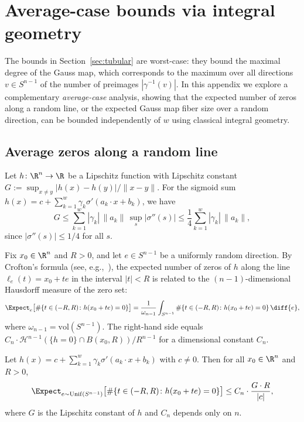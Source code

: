 \section{Average-case bounds via integral geometry}\label{app:averaging}

The bounds in Section~\ref{sec:tubular} are worst-case: they bound the maximal degree of the Gauss map, which corresponds to the maximum over all directions $v\in S^{n-1}$ of the number of preimages $|\gamma^{-1}(v)|$. In this appendix we explore a complementary \emph{average-case} analysis, showing that the expected number of zeros along a random line, or the expected Gauss map fiber size over a random direction, can be bounded independently of $w$ using classical integral geometry.

\subsection{Average zeros along a random line}

Let $h\colon \R^n\to \R$ be a Lipschitz function with Lipschitz constant $G := \sup_{x\neq y} |h(x)-h(y)|/\|x-y\|$. For the sigmoid sum $h(x) = c + \sum_{k=1}^w \gamma_k \sigma'(a_k\cdot x + b_k)$, we have
\begin{equation*}
  G \leq \sum_{k=1}^w |\gamma_k|\, \|a_k\|\, \sup_s |\sigma''(s)| \leq \frac{1}{4}\sum_{k=1}^w |\gamma_k|\, \|a_k\|,
\end{equation*}
since $|\sigma''(s)| \leq 1/4$ for all $s$.

Fix $x_0\in \R^n$ and $R > 0$, and let $e\in S^{n-1}$ be a uniformly random direction. By Crofton's formula (see, e.g.,~\cite[Chapter~14]{gray2004tubes}), the expected number of zeros of $h$ along the line $\ell_e(t) = x_0 + te$ in the interval $|t| < R$ is related to the $(n-1)$-dimensional Hausdorff measure of the zero set:
\begin{equation}\label{eq:crofton}
  \Expect_e\bigl[\#\{t\in (-R,R) \colon h(x_0+te) = 0\}\bigr] = \frac{1}{\omega_{n-1}} \int_{S^{n-1}} \#\{t\in (-R,R)\colon h(x_0+te)=0\}\,\diff{e},
\end{equation}
where $\omega_{n-1} = \mathrm{vol}(S^{n-1})$. The right-hand side equals $C_n \cdot \mathcal{H}^{n-1}(\{h=0\}\cap B(x_0,R))/R^{n-1}$ for a dimensional constant $C_n$.

\begin{proposition}\label{prop:avg-zeros}
Let $h(x) = c + \sum_{k=1}^w \gamma_k \sigma'(a_k\cdot x+b_k)$ with $c\neq 0$. Then for all $x_0\in \R^n$ and $R > 0$,
\begin{equation}\label{eq:avg-zero-bound}
  \Expect_{e\sim \mathrm{Unif}(S^{n-1})}\bigl[\#\{t\in (-R,R)\colon h(x_0+te) = 0\}\bigr] \leq C_n \cdot \frac{G\cdot R}{|c|},
\end{equation}
where $G$ is the Lipschitz constant of $h$ and $C_n$ depends only on $n$.
\end{proposition}

